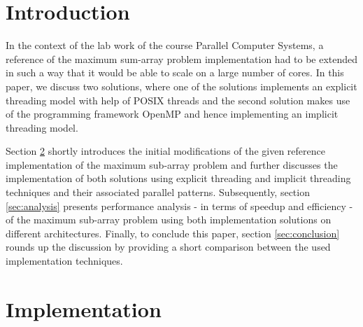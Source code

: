 \documentclass[conference]{IEEEtran}
\begin{document}





%
\IEEEpeerreviewmaketitle



\section{Introduction}
In the context of the lab work of the course Parallel Computer Systems, a reference of the maximum sum-array problem implementation had to be extended in such a way that it would be able to scale on a large number of cores. In this paper, we discuss two solutions, where one of the solutions implements an explicit threading model with help of POSIX threads and the second solution makes use of the programming framework OpenMP and hence implementing an implicit threading model. 

Section \ref{sec:impl} shortly introduces the initial modifications of the given reference implementation of the maximum sub-array problem and further discusses the implementation of both solutions using explicit threading and implicit threading techniques and their associated parallel patterns. Subsequently, section \ref{sec:analysis} presents performance analysis - in terms of speedup and efficiency - of the maximum sub-array problem using both implementation solutions on different architectures. Finally, to conclude this paper, section \ref{sec:conclusion} rounds up the discussion by providing a short comparison between the used implementation techniques. 

\section{Implementation}
\label{sec:impl}
\end{document}
